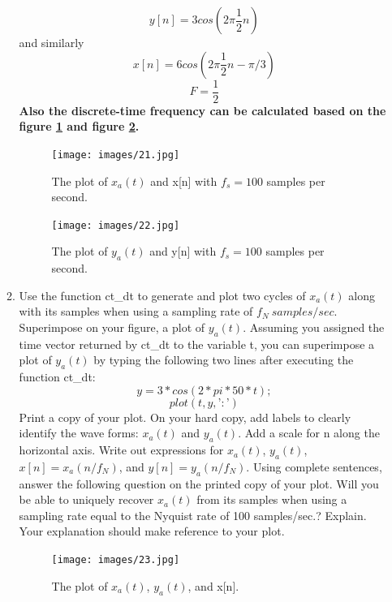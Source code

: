 \documentclass[12pt]{article}
\begin{document}
\begin{enumerate}
\begin{enumerate}
$$y[n] = 3 cos(2\pi\frac{1}{2}n)$$
 and similarly
$$x[n] = 6 cos(2\pi\frac{1}{2}n - \pi/3)$$
\textbf{
$$\boxed{F = \frac{1}{2}}$$
}
\textbf{Also the discrete-time frequency can be calculated based on the figure \ref{fig:21} and figure \ref{fig:22}.}


\begin{figure}[H]
    \centering
    \begin{minipage}[b]{0.7\textwidth}
        \texttt{[image: images/21.jpg]}
    \end{minipage}
    \caption{The plot of $x_a(t)$ and x[n] with $f_s = 100$ samples per second.}
    \label{fig:21}
\end{figure}

\begin{figure}[H]
    \centering
    \begin{minipage}[b]{0.7\textwidth}
        \texttt{[image: images/22.jpg]}
    \end{minipage}
    \caption{The plot of $y_a(t)$ and y[n] with $f_s = 100$ samples per second.}
    \label{fig:22}
\end{figure}







\item Use the function ct\_dt to generate and plot two cycles of $x_a(t)$ along with its samples when using a sampling rate of $f_N\ samples/sec$. Superimpose on your figure, a plot of $y_a(t)$. Assuming you assigned the time vector returned by ct\_dt to the variable t, you can superimpose a plot of $y_a(t)$ by typing the following two lines after executing the function ct\_dt:
$$
y = 3*cos(2*pi*50*t);
$$
$$
plot(t,y,’:’)
$$
Print a copy of your plot. On your hard copy, add labels to clearly identify the wave forms: $x_a(t)$ and $y_a(t)$. Add a scale for n along the horizontal axis. Write out expressions for
$x_a(t)$, $y_a(t)$, $x[n] = x_a(n/f_N)$, and $y[n] = y_a(n/f_N)$. Using complete sentences, answer the following question on the printed copy of your plot. Will you be able to uniquely recover $x_a(t)$ from its samples when using a sampling rate equal to the Nyquist rate of 100 samples/sec.? Explain. Your explanation should make reference to your plot.



\begin{figure}[H]
    \centering
    \begin{minipage}[b]{0.7\textwidth}
        \texttt{[image: images/23.jpg]}
    \end{minipage}
    \caption{The plot of $x_a(t)$, $y_a(t)$, and x[n].}
    \label{fig:23}
\end{figure}


\end{enumerate}
\end{enumerate}
\end{document}
